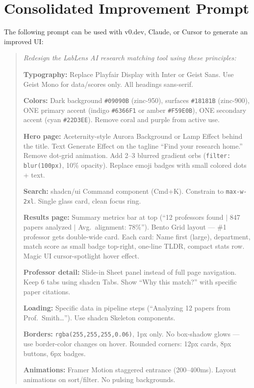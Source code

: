 \documentclass[11pt,letterpaper]{article}
\begin{document}
\section{Consolidated Improvement Prompt}

The following prompt can be used with v0.dev, Claude, or Cursor to generate an improved UI:

\begin{quote}
\itshape
Redesign the LabLens AI research matching tool using these principles:

\textbf{Typography:} Replace Playfair Display with Inter or Geist Sans. Use Geist Mono for data/scores only. All headings sans-serif.

\textbf{Colors:} Dark background \texttt{\#09090B} (zinc-950), surfaces \texttt{\#18181B} (zinc-900), ONE primary accent (indigo \texttt{\#6366F1} or amber \texttt{\#F59E0B}), ONE secondary accent (cyan \texttt{\#22D3EE}). Remove coral and purple from active use.

\textbf{Hero page:} Aceternity-style Aurora Background or Lamp Effect behind the title. Text Generate Effect on the tagline ``Find your research home.'' Remove dot-grid animation. Add 2--3 blurred gradient orbs (\texttt{filter: blur(100px)}, 10\% opacity). Replace emoji badges with small colored dots + text.

\textbf{Search:} shadcn/ui Command component (Cmd+K). Constrain to \texttt{max-w-2xl}. Single glass card, clean focus ring.

\textbf{Results page:} Summary metrics bar at top (``12 professors found $\mid$ 847 papers analyzed $\mid$ Avg.\ alignment: 78\%''). Bento Grid layout --- \#1 professor gets double-wide card. Each card: Name first (large), department, match score as small badge top-right, one-line TLDR, compact stats row. Magic UI cursor-spotlight hover effect.

\textbf{Professor detail:} Slide-in Sheet panel instead of full page navigation. Keep 6 tabs using shadcn Tabs. Show ``Why this match?'' with specific paper citations.

\textbf{Loading:} Specific data in pipeline steps (``Analyzing 12 papers from Prof.\ Smith\ldots''). Use shadcn Skeleton components.

\textbf{Borders:} \texttt{rgba(255,255,255,0.06)}, 1px only. No box-shadow glows --- use border-color changes on hover. Rounded corners: 12px cards, 8px buttons, 6px badges.

\textbf{Animations:} Framer Motion staggered entrance (200--400ms). Layout animations on sort/filter. No pulsing backgrounds.
\end{quote}
\end{document}
